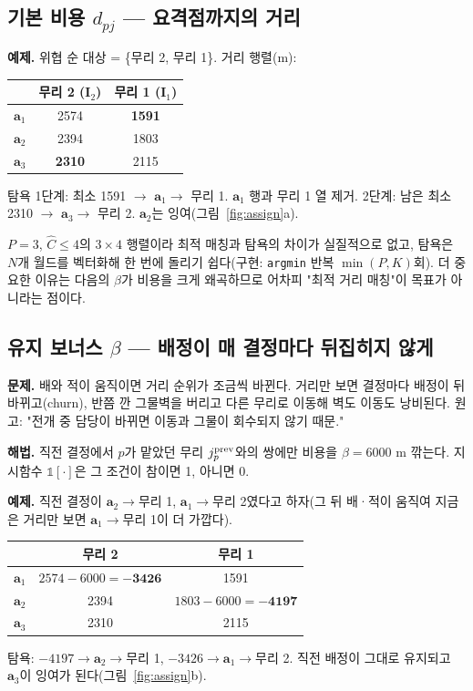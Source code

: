 \documentclass[11pt,a4paper]{article}
\newcommand{\bfa}{\mathbf{a}}
\newcommand{\bfI}{\mathbf{I}}
\begin{document}
\subsection{기본 비용 $d_{pj}$ --- 요격점까지의 거리}

\textbf{예제.} 위협 순 대상 = \{무리 2, 무리 1\}. 거리 행렬(m):
\begin{table}[H]
\centering\small
\begin{tabular}{c c c}
\toprule
 & 무리 2 ($\bfI_2$) & 무리 1 ($\bfI_1$) \\
\midrule
$\bfa_1$ & 2574 & \textbf{1591} \\
$\bfa_2$ & 2394 & 1803 \\
$\bfa_3$ & \textbf{2310} & 2115 \\
\bottomrule
\end{tabular}
\end{table}
탐욕 1단계: 최소 1591 $\to$ $\bfa_1\to$ 무리 1. $\bfa_1$ 행과 무리 1 열 제거. 2단계: 남은 최소 2310 $\to$ $\bfa_3\to$ 무리 2. $\bfa_2$는 잉여(그림~\ref{fig:assign}a).

\begin{whybox}
$P=3$, $\hat C\le4$의 $3\times4$ 행렬이라 최적 매칭과 탐욕의 차이가 실질적으로 없고, 탐욕은 $N$개 월드를 벡터화해 한 번에 돌리기 쉽다(구현: \texttt{argmin} 반복 $\min(P,K)$회). 더 중요한 이유는 다음의 $\beta$가 비용을 크게 왜곡하므로 어차피 "최적 거리 매칭"이 목표가 아니라는 점이다.
\end{whybox}

\subsection{유지 보너스 $\beta$ --- 배정이 매 결정마다 뒤집히지 않게}

\textbf{문제.} 배와 적이 움직이면 거리 순위가 조금씩 바뀐다. 거리만 보면 결정마다 배정이 뒤바뀌고(churn), 반쯤 깐 그물벽을 버리고 다른 무리로 이동해 벽도 이동도 낭비된다. 원고: "전개 중 담당이 바뀌면 이동과 그물이 회수되지 않기 때문."

\textbf{해법.} 직전 결정에서 $p$가 맡았던 무리 $j_p^{\rm prev}$와의 쌍에만 비용을 $\beta=6000$ m 깎는다. 지시함수 $\mathbb 1[\cdot]$은 그 조건이 참이면 1, 아니면 0.

\textbf{예제.} 직전 결정이 $\bfa_2\to$무리 1, $\bfa_1\to$무리 2였다고 하자(그 뒤 배·적이 움직여 지금은 거리만 보면 $\bfa_1\to$무리 1이 더 가깝다).
\begin{table}[H]
\centering\small
\begin{tabular}{c c c}
\toprule
 & 무리 2 & 무리 1 \\
\midrule
$\bfa_1$ & $2574-6000=\mathbf{-3426}$ & 1591 \\
$\bfa_2$ & 2394 & $1803-6000=\mathbf{-4197}$ \\
$\bfa_3$ & 2310 & 2115 \\
\bottomrule
\end{tabular}
\end{table}
탐욕: $-4197\to\bfa_2\to$무리 1, $-3426\to\bfa_1\to$무리 2. 직전 배정이 그대로 유지되고 $\bfa_3$이 잉여가 된다(그림~\ref{fig:assign}b).
\end{document}
